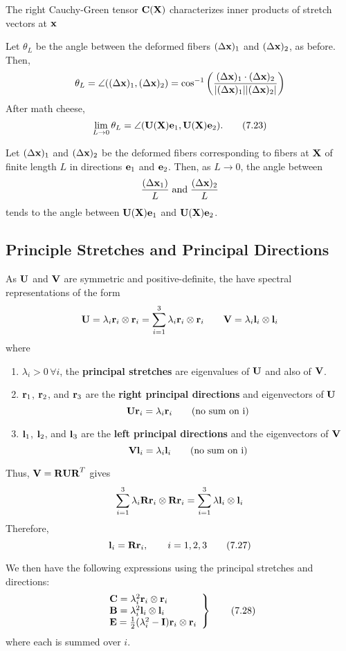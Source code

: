 \documentclass{article}
\begin{document}
\begin{remark}
	The right Cauchy-Green tensor $\textbf{C}(\textbf{X})$ characterizes inner products of stretch vectors at $\textbf{x}$
\end{remark}

Let $\theta_L$ be the angle between the deformed fibers $(\Delta\textbf{x})_1$ and $(\Delta\textbf{x})_2$, as before.
Then,
\[
	\theta_L = \angle((\Delta\textbf{x})_1,(\Delta\textbf{x})_2) = \cos^{-1}\left( \frac{(\Delta\textbf{x})_1 \cdot (\Delta\textbf{x})_2}{|(\Delta\textbf{x})_1||(\Delta\textbf{x})_2|} \right)
\]
After math cheese,
\[
	\lim\limits_{L\to 0}\theta_L = \angle(\textbf{U}(\textbf{X})\textbf{e}_1, \textbf{U}(\textbf{X})\textbf{e}_2). \tag{7.23}\label{eq:7.23}
\]

\begin{remark}
	Let $(\Delta\textbf{x})_1$ and $(\Delta\textbf{x})_2$ be the deformed fibers corresponding to fibers at $\textbf{X}$ of finite length $L$ in directions $\textbf{e}_1$ and $\textbf{e}_2$. Then, as $L\to 0$, the angle between
	$$\frac{(\Delta\textbf{x}_1)}{L} \; \text{and} \; \frac{(\Delta\textbf{x})_2}{L}$$
	tends to the angle between $\textbf{U}(\textbf{X})\textbf{e}_1$ and $\textbf{U}(\textbf{X})\textbf{e}_2$.
\end{remark}

\subsection{Principle Stretches and Principal Directions}
As $\textbf{U}$ and $\textbf{V}$ are symmetric and positive-definite, the have spectral representations of the form
\[
	\textbf{U} = \lambda_i\textbf{r}_i \otimes\textbf{r}_i = \sum_{i=1}^{3}\lambda_i\textbf{r}_i\otimes\textbf{r}_i \qquad
	\textbf{V} =  \lambda_i\textbf{l}_i\otimes\textbf{l}_i
\]
where
\begin{enumerate}
	\item $\lambda_i > 0 \, \forall i$, the \textbf{principal stretches} are eigenvalues of $\textbf{U}$ and also of $\textbf{V}$.
	\item $\textbf{r}_1$, $\textbf{r}_2$, and $\textbf{r}_3$ are the \textbf{right principal directions} and eigenvectors of $\textbf{U}$
	$$\textbf{U}\textbf{r}_i = \lambda_i\textbf{r}_i \qquad \text{(no sum on i)}$$
	\item $\textbf{l}_1$, $\textbf{l}_2$, and $\textbf{l}_3$ are the \textbf{left principal directions} and the eigenvectors of $\textbf{V}$
	$$\textbf{V}\textbf{l}_i = \lambda_i\textbf{l}_i \qquad \text{(no sum on i)}$$
\end{enumerate}

Thus, $\textbf{V} = \textbf{R}\textbf{U}\textbf{R}^T$ gives
\[
	\sum_{i=1}^{3}\lambda_i\textbf{R}\textbf{r}_i\otimes\textbf{R}\textbf{r}_i = \sum_{i=1}^{3}\lambda\textbf{l}_i\otimes\textbf{l}_i
\]
Therefore,
\[
	\textbf{l}_i = \textbf{R}\textbf{r}_i, \qquad i =1,2,3\tag{7.27}\label{eq:7.27}
\]

We then have the following expressions using the principal stretches and directions:
\[
	\left.
	\begin{array}{l}
	\textbf{C} = \lambda_i^2\textbf{r}_i\otimes\textbf{r}_i\\
	\textbf{B} = \lambda_i^2\textbf{l}_i\otimes\textbf{l}_i\\
	\textbf{E} = \frac{1}{2}(\lambda_i^2 - \textbf{I})\textbf{r}_i\otimes\textbf{r}_i
	\end{array}
	\right\rbrace\tag{7.28}\label{eq:7.28}
\]
where each is summed over $i$.
\end{document}
